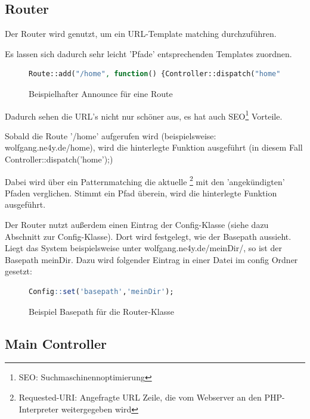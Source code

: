 \subsection{Router} 

Der Router wird genutzt, um ein URL-Template matching durchzuführen. 

\pm

Es lassen sich dadurch sehr leicht 'Pfade' entsprechenden Templates 
zuordnen. 

\begin{figure}[h!]
	\begin{lstlisting}[language=php]
Route::add("/home", function() {Controller::dispatch("home");});	
	\end{lstlisting}
	\caption{Beispielhafter Announce für eine Route}
\end{figure}

Dadurch sehen die URL's nicht nur schöner aus, es hat auch SEO\footnote{SEO: Suchmaschinennoptimierung} Vorteile.

\pm

Sobald die Route '/home' aufgerufen wird (beispielsweise: wolfgang.ne4y.de/home), wird die hinterlegte Funktion ausgeführt (in diesem Fall Controller::dispatch('home');)

\pm

Dabei wird über ein Patternmatching die aktuelle 
\footnote{Requested-URI: Angefragte URL Zeile, die vom Webserver an 
den PHP-Interpreter weitergegeben wird} mit den 'angekündigten' Pfaden verglichen. Stimmt ein Pfad überein, wird die hinterlegte Funktion ausgeführt.

\pm

Der Router nutzt außerdem einen Eintrag der Config-Klasse (siehe dazu Abschnitt zur Config-Klasse). Dort wird festgelegt, wie der Basepath aussieht. Liegt das System beispielsweise unter wolfgang.ne4y.de/meinDir/, so ist der Basepath meinDir. Dazu wird folgender Eintrag in einer Datei im config Ordner gesetzt: 

\begin{figure}[h!]
	\begin{lstlisting}[language=R]
	Config::set('basepath','meinDir');
	\end{lstlisting}
	\caption{Beispiel Basepath für die Router-Klasse}
\end{figure}

\subsection{Main Controller}

